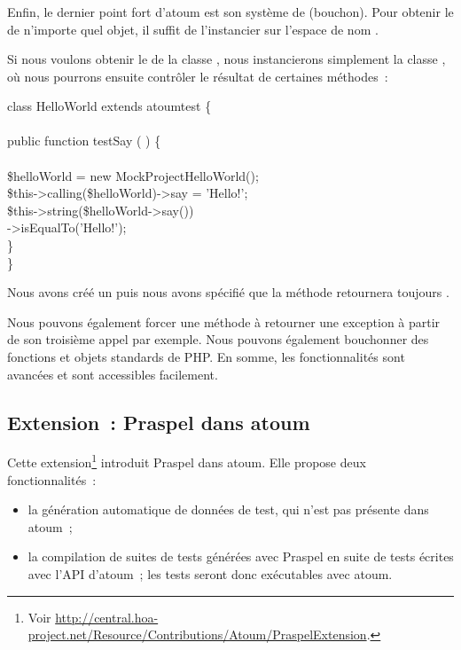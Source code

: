 \subsubsection{}

Enfin, le dernier point fort d'atoum est son système de 
(bouchon). Pour obtenir le  de n'importe quel objet, il suffit
de l'instancier sur l'espace de nom .

\begin{example}

Si nous voulons obtenir le  de la classe
, nous instancierons simplement la classe
, où nous pourrons ensuite
contrôler le résultat de certaines méthodes~:
%
\begin{pre}
class HelloWorld extends \bslash{}atoum\bslash{}test \{ \\
 \\
    public function testSay ( ) \{ \\
 \\
        \$helloWorld = new \bslash{}Mock\bslash{}Project\bslash{}HelloWorld(); \\
        \$this->calling(\$helloWorld)->say = 'Hello!'; \\
        \$this->string(\$helloWorld->say()) \\
                  ->isEqualTo('Hello!'); \\
    \} \\
\}
\end{pre}
%
Nous avons créé un  puis nous avons spécifié que la méthode
 retournera toujours .

\end{example}

Nous pouvons également forcer une méthode à retourner une exception à partir de
son troisième appel par exemple. Nous pouvons également bouchonner des fonctions
et objets standards de PHP. En somme, les fonctionnalités sont avancées et sont
accessibles facilement.

\subsection{Extension~: Praspel dans atoum}
\label{subsection:tools:extension}

Cette extension\footnote{Voir
\url{http://central.hoa-project.net/Resource/Contributions/Atoum/PraspelExtension}.}
introduit Praspel dans atoum. Elle propose deux fonctionnalités~:
%
\begin{itemize}

\item la génération automatique de données de test, qui n'est pas présente dans
atoum~;

\item la compilation de suites de tests générées avec Praspel en suite de tests
écrites avec l'API d'atoum~; les tests seront donc exécutables avec atoum.

\end{itemize}

